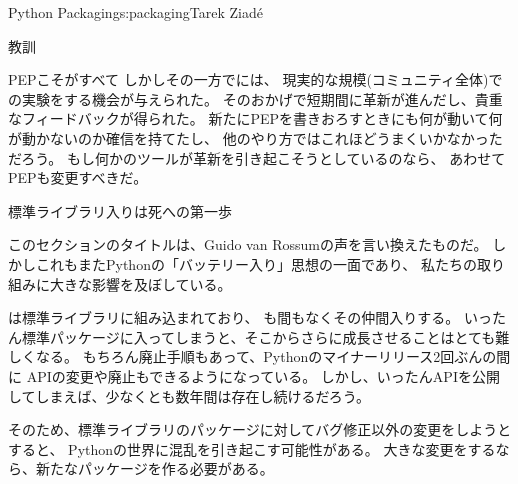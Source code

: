 \begin{aosachapter}{Python Packaging}{s:packaging}{Tarek Ziad\'{e}}
\begin{aosasect1}{教訓}
\begin{aosasect2}{PEPこそがすべて}
しかしその一方でには、
現実的な規模(コミュニティ全体)での実験をする機会が与えられた。
そのおかげで短期間に革新が進んだし、貴重なフィードバックが得られた。
新たにPEPを書きおろすときにも何が動いて何が動かないのか確信を持てたし、
他のやり方ではこれほどうまくいかなかっただろう。
もし何かのツールが革新を引き起こそうとしているのなら、
あわせてPEPも変更すべきだ。

\end{aosasect2}

\begin{aosasect2}{標準ライブラリ入りは死への第一歩}

このセクションのタイトルは、Guido van Rossumの声を言い換えたものだ。
しかしこれもまたPythonの「バッテリー入り」思想の一面であり、
私たちの取り組みに大きな影響を及ぼしている。

は標準ライブラリに組み込まれており、
も間もなくその仲間入りする。
いったん標準パッケージに入ってしまうと、そこからさらに成長させることはとても難しくなる。
もちろん廃止手順もあって、Pythonのマイナーリリース2回ぶんの間に
APIの変更や廃止もできるようになっている。
しかし、いったんAPIを公開してしまえば、少なくとも数年間は存在し続けるだろう。

そのため、標準ライブラリのパッケージに対してバグ修正以外の変更をしようとすると、
Pythonの世界に混乱を引き起こす可能性がある。
大きな変更をするなら、新たなパッケージを作る必要がある。


\end{aosasect2}
\end{aosasect1}
\end{aosachapter}
